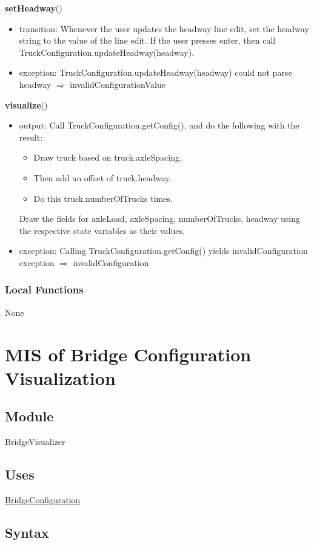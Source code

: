 \documentclass[12pt, titlepage]{article}
\begin{document}
\noindent \textbf{setHeadway}()
\begin{itemize}
\item transition: Whenever the user updates the headway line edit, set the headway string to the value of the line edit. If the user presses enter, then call TruckConfiguration.updateHeadway(headway).
\item exception: TruckConfiguration.updateHeadway(headway) could not parse headway $\Rightarrow$ invalidConfigurationValue
\end{itemize}

\noindent \textbf{visualize}()
\begin{itemize}
\item output: Call TruckConfiguration.getConfig(), and do the following with the result:
\begin{itemize}
\item Draw truck based on truck.axleSpacing.
\item Then add an offset of truck.headway.	
\item Do this truck.numberOfTrucks times.
\end{itemize}
Draw the fields for axleLoad, axleSpacing, numberOfTrucks, headway using the respective state variables as their values.
\item exception: Calling TruckConfiguration.getConfig() yields invalidConfiguration exception $\Rightarrow$ invalidConfiguration
\end{itemize}
\subsubsection{Local Functions}
None

\newpage
\section{MIS of Bridge Configuration Visualization} \label{BridgeVisualizer}

\subsection{Module}

BridgeVisualizer

\subsection{Uses}
\hyperref[BridgeConfiguration]{BridgeConfiguration}

\subsection{Syntax}
\end{document}
